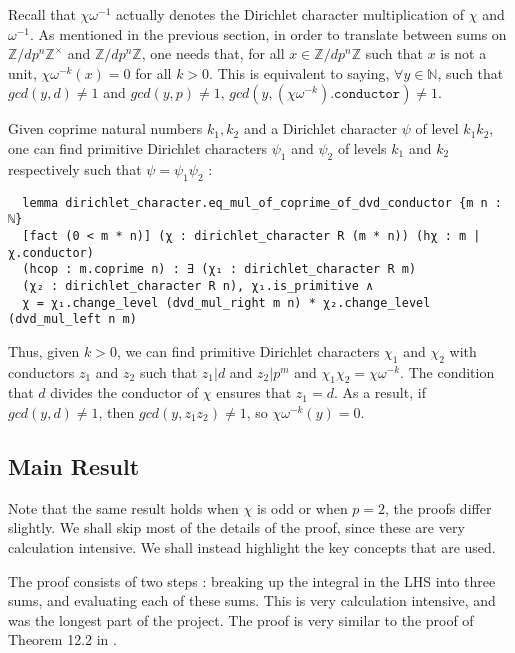 \documentclass[a4paper,UKenglish,cleveref, autoref, thm-restate]{lipics-v2021}
\begin{document}
Recall that $\chi \omega^{-1}$ actually denotes the Dirichlet 
character multiplication of $\chi$ and $\omega^{-1}$. As mentioned in the previous section, in order to translate between sums on 
$\mathbb{Z}/ d p^n \mathbb{Z} ^{\times}$ and $\mathbb{Z}/ d p^n \mathbb{Z}$, one needs that, for all $x \in \mathbb{Z}/ d p^n \mathbb{Z}$ 
such that $x$ is not a unit, $\chi \omega^{-k} (x) = 0$ for all $k > 0$. This is equivalent to saying, $\forall y \in \mathbb{N}$, such that 
$gcd (y, d) \ne 1$ and $gcd (y, p) \ne 1$, $gcd (y, (\chi \omega^{-k})\texttt{.conductor}) \ne 1$. 

Given coprime natural numbers $k_1, k_2$ and a Dirichlet character $\psi$ of level $k_1 k_2$, one can find primitive Dirichlet characters 
$\psi_1$ and $\psi_2$ of levels $k_1$ and $k_2$ respectively such that $\psi = \psi_1 \psi_2$ : 
\begin{lstlisting}
  lemma dirichlet_character.eq_mul_of_coprime_of_dvd_conductor {m n : ℕ} 
  [fact (0 < m * n)] (χ : dirichlet_character R (m * n)) (hχ : m | χ.conductor) 
  (hcop : m.coprime n) : ∃ (χ₁ : dirichlet_character R m) 
  (χ₂ : dirichlet_character R n), χ₁.is_primitive ∧ 
  χ = χ₁.change_level (dvd_mul_right m n) * χ₂.change_level (dvd_mul_left n m) 
\end{lstlisting}

Thus, given $k > 0$, we can find primitive Dirichlet characters $\chi_1$ and $\chi_2$ with conductors $z_1$ and $z_2$ such that 
$z_1 | d$ and $z_2 | p^m$ and $\chi_1 \chi_2 = \chi \omega^{-k}$. The condition that $d$ divides the conductor of $\chi$ ensures 
that $z_1 = d$. As a result, if $gcd (y, d) \ne 1$, then $gcd (y, z_1 z_2) \ne 1$, so $\chi \omega^{-k} (y) = 0$.

\subsection{Main Result}
Note that the same result holds when $\chi$ is odd or when $p = 2$, the proofs differ slightly. We shall 
skip most of the details of the proof, since these are very calculation intensive. We shall instead highlight the key concepts 
that are used. 

The proof consists of two steps : breaking up the integral in the LHS into three sums, 
and evaluating each of these sums. This is very calculation intensive, and was the longest part of the project. 
The proof is very similar to the proof of Theorem 12.2 in \cite{cyc}. 
\end{document}
